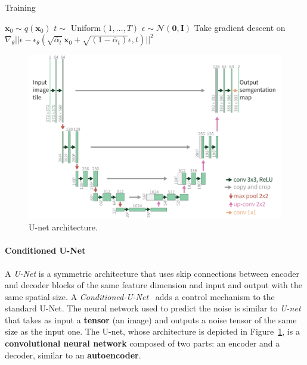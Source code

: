 \documentclass[preprint]{elsarticle}
\begin{document}
\begin{algorithm}[t]
    \caption{Training}\label{alg:training}
    \begin{algorithmic}[1]
    \Repeat
        \State $\mathbf{x}_0 \sim q(\mathbf{x}_0)$
        \State $t \sim$ Uniform$({1,\ldots,T})$
        \State $\epsilon \sim \mathcal{N}(\mathbf{0},\mathbf{I})$ 
        \State Take gradient descent on 
        $\nabla_\theta||\epsilon - \epsilon_\theta
	(\sqrt{\bar{\alpha}_t}\mathbf{x}_0 + \sqrt{(1-\bar{\alpha}_t)}\epsilon,t) ||^2$
    \end{algorithmic}
\end{algorithm}




\begin{figure}[t]
	\centering
    \includegraphics[scale=0.87]{img/svg/UNET.png}
	\caption{U-net architecture.}\label{fig:unet}
\end{figure}



\paragraph{Conditioned U-Net} A \emph{U-Net} is a symmetric architecture that uses skip connections between encoder and decoder blocks of the same feature dimension and input and output with the same spatial size. A \emph{Conditioned-U-Net}~\cite{conditionedunet} adds a control mechanism to the standard U-Net.
The neural network used to predict the noise is similar to \emph{U-net}~\cite{ronneberger2015unet} that takes as input a  \textbf{tensor} (an image) and outputs a noise tensor of the same size as the input one. The U-net, whose architecture is depicted in Figure~\ref{fig:unet}, is a \textbf{convolutional neural network}  composed of two parts: an encoder and a decoder, similar to an \textbf{autoencoder}.
\end{document}
